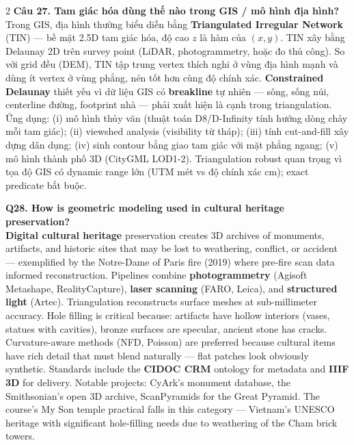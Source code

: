 \begin{paracol}{2}
\textbf{Câu 27. Tam giác hóa dùng thế nào trong GIS / mô hình địa hình?}\\
Trong GIS, địa hình thường biểu diễn bằng \textbf{Triangulated Irregular Network} (TIN) — bề mặt 2.5D tam giác hóa, độ cao $z$ là hàm của $(x,y)$. TIN xây bằng Delaunay 2D trên survey point (LiDAR, photogrammetry, hoặc đo thủ công). So với grid đều (DEM), TIN tập trung vertex thích nghi ở vùng địa hình mạnh và dùng ít vertex ở vùng phẳng, nén tốt hơn cùng độ chính xác. \textbf{Constrained Delaunay} thiết yếu vì dữ liệu GIS có \textbf{breakline} tự nhiên — sông, sống núi, centerline đường, footprint nhà — phải xuất hiện là cạnh trong triangulation. Ứng dụng: (i) mô hình thủy văn (thuật toán D8/D-Infinity tính hướng dòng chảy mỗi tam giác); (ii) viewshed analysis (visibility từ tháp); (iii) tính cut-and-fill xây dựng dân dụng; (iv) sinh contour bằng giao tam giác với mặt phẳng ngang; (v) mô hình thành phố 3D (CityGML LOD1-2). Triangulation robust quan trọng vì tọa độ GIS có dynamic range lớn (UTM mét vs độ chính xác cm); exact predicate bắt buộc.

\switchcolumn*

\textbf{Q28. How is geometric modeling used in cultural heritage preservation?}\\
\textbf{Digital cultural heritage} preservation creates 3D archives of monuments, artifacts, and historic sites that may be lost to weathering, conflict, or accident — exemplified by the Notre-Dame of Paris fire (2019) where pre-fire scan data informed reconstruction. Pipelines combine \textbf{photogrammetry} (Agisoft Metashape, RealityCapture), \textbf{laser scanning} (FARO, Leica), and \textbf{structured light} (Artec). Triangulation reconstructs surface meshes at sub-millimeter accuracy. Hole filling is critical because: artifacts have hollow interiors (vases, statues with cavities), bronze surfaces are specular, ancient stone has cracks. Curvature-aware methods (NFD, Poisson) are preferred because cultural items have rich detail that must blend naturally — flat patches look obviously synthetic. Standards include the \textbf{CIDOC CRM} ontology for metadata and \textbf{IIIF 3D} for delivery. Notable projects: CyArk's monument database, the Smithsonian's open 3D archive, ScanPyramids for the Great Pyramid. The course's My Son temple practical falls in this category — Vietnam's UNESCO heritage with significant hole-filling needs due to weathering of the Cham brick towers.

\switchcolumn


\end{paracol}
